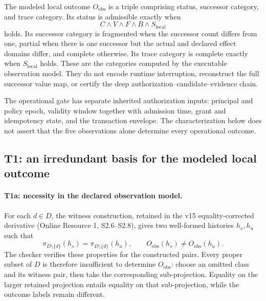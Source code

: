 The modeled local outcome $O_{\mathrm{obs}}$ is a triple comprising status, successor category, and trace category. Its status is admissible exactly when
\[
 C\land V\land F\land B\land S_{\mathrm{local}}
\]
holds. Its successor category is fragmented when the successor count differs from one, partial when there is one successor but the actual and declared effect domains differ, and complete otherwise. Its trace category is complete exactly when $S_{\mathrm{local}}$ holds. These are the categories computed by the executable observation model. They do not encode runtime interruption, reconstruct the full successor value map, or certify the deep authorization--candidate--evidence chain.

The operational gate has separate inherited authorization inputs: principal and policy epoch, validity window together with admission time, grant and idempotency state, and the transaction envelope. The characterization below does not assert that the five observations alone determine every operational outcome.

\subsection{T1: an irredundant basis for the modeled local outcome}
\label{app:t1}
\paragraph{T1a: necessity in the declared observation model.}
For each $d\in D$, the witness construction, retained in the v15 equality-corrected derivative (Online Resource 1, S2.6--S2.8), gives two well-formed histories $h_s,h_u$ such that
\[
 \pi_{D\setminus\{d\}}(h_s)=\pi_{D\setminus\{d\}}(h_u),
 \qquad
 O_{\mathrm{obs}}(h_s)\ne O_{\mathrm{obs}}(h_u).
\]
The checker verifies these properties for the constructed pairs. Every proper subset of $D$ is therefore insufficient to determine $O_{\mathrm{obs}}$: choose an omitted class and its witness pair, then take the corresponding sub-projection. Equality on the larger retained projection entails equality on that sub-projection, while the outcome labels remain different.

